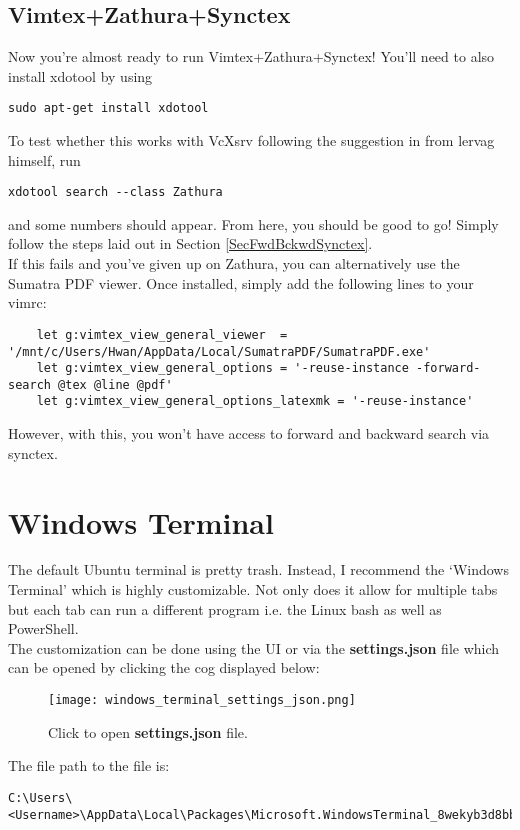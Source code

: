 \subsection{Vimtex+Zathura+Synctex}
Now you're almost ready to run Vimtex+Zathura+Synctex! You'll need to also
install xdotool by using
\begin{lstlisting}
sudo apt-get install xdotool
\end{lstlisting}
To test whether this
works with VcXsrv following the suggestion in \cite{paulrougieux2020vimtex} from
lervag himself, run
\begin{lstlisting}
xdotool search --class Zathura
\end{lstlisting}
and some numbers should appear. From here, you should be good to go! Simply
follow the steps laid out in Section \ref{SecFwdBckwdSynctex}.\\

If this fails and you've given up on Zathura, you can alternatively use the
Sumatra PDF viewer. Once installed, simply add the following lines to your
vimrc:
\begin{lstlisting}
    let g:vimtex_view_general_viewer  = '/mnt/c/Users/Hwan/AppData/Local/SumatraPDF/SumatraPDF.exe'
    let g:vimtex_view_general_options = '-reuse-instance -forward-search @tex @line @pdf'
    let g:vimtex_view_general_options_latexmk = '-reuse-instance'
\end{lstlisting}
However, with this, you won't have access to forward and backward search via
synctex.

\section{Windows Terminal}
The default Ubuntu terminal is pretty trash. Instead, I recommend the `Windows
Terminal' which is highly customizable. Not only does it allow for multiple tabs
but each tab can run a different program i.e. the Linux bash as well as
PowerShell.\\

The customization can be done using the UI or via the \textbf{settings.json}
file which can be opened by clicking the cog displayed below:
\begin{figure}[H]
    \centering
    \texttt{[image: windows\_terminal\_settings\_json.png]}
    \caption{Click to open \textbf{settings.json} file.}
    \label{FigWindowsTerminalSettingsJSON}
\end{figure}
The file path to the file is:
\begin{lstlisting}
C:\Users\<Username>\AppData\Local\Packages\Microsoft.WindowsTerminal_8wekyb3d8bbwe\LocalState
\end{lstlisting}

